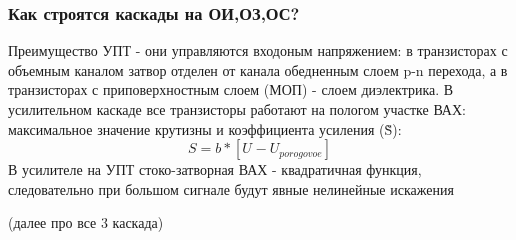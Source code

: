\subsubsection{Как строятся каскады на ОИ,ОЗ,ОС?}

Преимущество УПТ - они управляются входоным напряжением: в транзисторах с объемным каналом затвор отделен от канала обедненным слоем p-n перехода, а в транзисторах с приповерхностным слоем (МОП) - слоем диэлектрика.
В усилительном каскаде все транзисторы работают на пологом участке ВАХ: максимальное значение крутизны и коэффициента усиления (\~S):
$$
S=b*[U_{}-U_{porogovoe}]
$$
В усилителе на УПТ стоко-затворная ВАХ - квадратичная функция, следовательно при большом сигнале будут явные нелинейные искажения
\begin{center}
\begin{figure}[h!]
\end{figure}
\end{center}
(далее про все 3 каскада)
